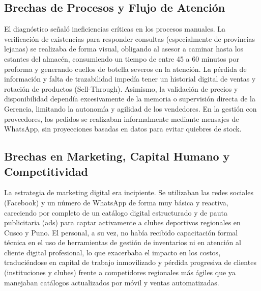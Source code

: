 \subsection{Brechas de Procesos y Flujo de Atención}
El diagnóstico señaló ineficiencias críticas en los procesos manuales. La verificación de existencias para responder consultas (especialmente de provincias lejanas) se realizaba de forma visual, obligando al asesor a caminar hasta los estantes del almacén, consumiendo un tiempo de entre 45 a 60 minutos por proforma y generando cuellos de botella severos en la atención. 
La pérdida de información y falta de trazabilidad impedía tener un historial digital de ventas y rotación de productos (Sell-Through). Asimismo, la validación de precios y disponibilidad dependía excesivamente de la memoria o supervisión directa de la Gerencia, limitando la autonomía y agilidad de los vendedores. En la gestión con proveedores, los pedidos se realizaban informalmente mediante mensajes de WhatsApp, sin proyecciones basadas en datos para evitar quiebres de stock.

\subsection{Brechas en Marketing, Capital Humano y Competitividad}
La estrategia de marketing digital era incipiente. Se utilizaban las redes sociales (Facebook) y un número de WhatsApp de forma muy básica y reactiva, careciendo por completo de un catálogo digital estructurado y de pauta publicitaria (ads) para captar activamente a clubes deportivos regionales en Cusco y Puno. 
El personal, a su vez, no había recibido capacitación formal técnica en el uso de herramientas de gestión de inventarios ni en atención al cliente digital profesional, lo que exacerbaba el impacto en los costos, traduciéndose en capital de trabajo inmovilizado y pérdida progresiva de clientes (instituciones y clubes) frente a competidores regionales más ágiles que ya manejaban catálogos actualizados por móvil y ventas automatizadas.
